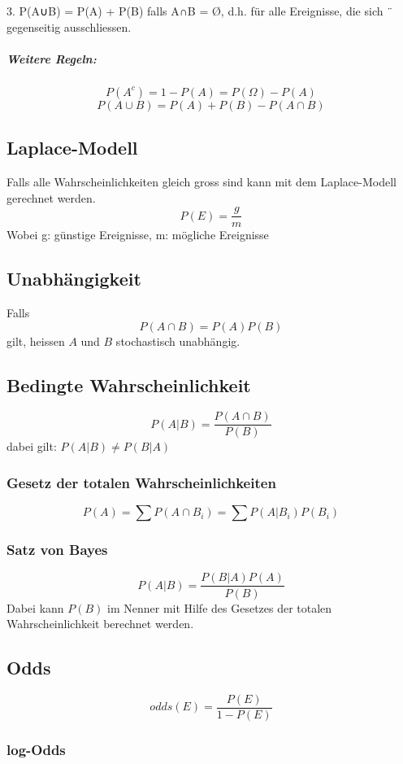 \documentclass{article}
\begin{document}
\begin{multicols*}{3}
      3. P(A∪B) = P(A) + P(B) falls A∩B = \O , d.h. für alle Ereignisse, die sich ¨
      gegenseitig ausschliessen.

      \subparagraph{Weitere Regeln:}

      $$P(A^c) = 1 - P(A) = P(\Omega) - P(A)$$
      $$P(A \cup B) = P(A) + P(B) - P(A \cap B)$$

    \subsection{Laplace-Modell}
      Falls alle Wahrscheinlichkeiten gleich gross sind kann mit dem Laplace-Modell gerechnet werden.
      $$P(E)=\frac{g}{m}$$
      Wobei g: günstige Ereignisse, m: mögliche Ereignisse

    \subsection{Unabhängigkeit}

      Falls  $$ P(A\cap B) = P(A)P(B)$$ gilt, heissen $A$ und $B$ stochastisch unabhängig.

    \subsection{Bedingte Wahrscheinlichkeit}

      $$P(A|B) = \frac{P(A\cap B)}{P(B)}$$
      dabei gilt: $P(A|B) \ne P(B|A)$

      \subsubsection{Gesetz der totalen Wahrscheinlichkeiten}
      $$P(A) = \sum{P(A\cap B_i)} = \sum{P(A|B_i)P(B_i)}$$

      \subsubsection{Satz von Bayes}
      $$P(A|B) = \frac{P(B|A)P(A)}{P(B)}$$
      Dabei kann $P(B)$ im Nenner mit Hilfe des Gesetzes der totalen Wahrscheinlichkeit berechnet werden.

    \subsection{Odds}
      $$ odds(E) = \frac{P(E)}{1-P(E)}$$

      \subsubsection{log-Odds}


\end{multicols*}
\end{document}
